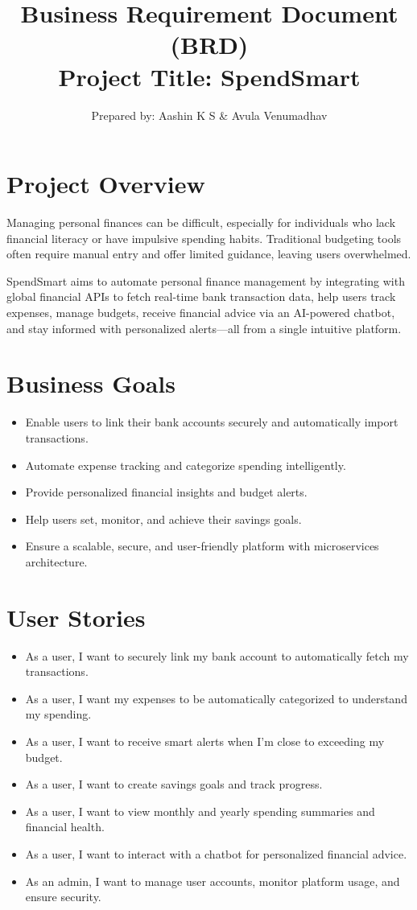 \documentclass{article}
\title{\textbf{Business Requirement Document (BRD)}
\vspace{10pt}
\\\large \textbf{Project Title: SpendSmart}}
\author{Prepared by: Aashin K S \& Avula Venumadhav}
\date{}
\begin{document}
\maketitle

\section{Project Overview}
Managing personal finances can be difficult, especially for individuals who lack financial literacy or have impulsive spending habits.
Traditional budgeting tools often require manual entry and offer limited guidance, leaving users overwhelmed.

SpendSmart aims to automate personal finance management by integrating with global financial APIs to fetch real-time bank transaction data, help users track expenses, manage budgets, receive financial advice via an AI-powered chatbot, and stay informed with personalized alerts—all from a single intuitive platform.

\section{Business Goals}
\begin{itemize}
    \item Enable users to link their bank accounts securely and automatically import transactions.
    \item Automate expense tracking and categorize spending intelligently.
    \item Provide personalized financial insights and budget alerts.
    \item Help users set, monitor, and achieve their savings goals.
    \item Ensure a scalable, secure, and user-friendly platform with microservices architecture.
\end{itemize}

\section{User Stories}
\begin{itemize}
    \item As a user, I want to securely link my bank account to automatically fetch my transactions.
    \item As a user, I want my expenses to be automatically categorized to understand my spending.
    \item As a user, I want to receive smart alerts when I'm close to exceeding my budget.
    \item As a user, I want to create savings goals and track progress.
    \item As a user, I want to view monthly and yearly spending summaries and financial health.
    \item As a user, I want to interact with a chatbot for personalized financial advice.
    \item As an admin, I want to manage user accounts, monitor platform usage, and ensure security.
\end{itemize}
\end{document}
